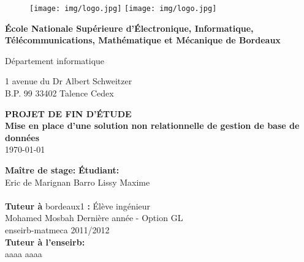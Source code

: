 \def\logo{
  \begin {figure}[H]
	\texttt{[image: img/logo.jpg]}
        \hspace{10,3cm}
	\texttt{[image: img/logo.jpg]}
	\label{logo}
  \end {figure}
}

\def\title{Mise en place d'une solution non relationnelle de gestion de base de données}

\def\intervenant{
        \begin{flushleft}
	  \begin{tabbing}
		\textbf{Maître de stage:}
                \hspace{7.2cm} \=\textbf{Étudiant:} \\
                \noindent Eric de {\sc Marignan}
                \> {\sc Barro} Lissy Maxime\\
                \> \\
                \noindent \textbf{Tuteur à} {\sc bordeaux}1 {\bf :}
                \> Élève ingénieur\\
                \noindent Mohamed {\sc Mosbah}
                \> Dernière année - Option GL \\ 
                \> {\sc enseirb-matmeca} 2011/2012 \\
                \noindent \textbf{Tuteur à l'{\sc enseirb}:}
                \> \\
                \noindent aaaa {\sc aaaa}
	  \end{tabbing}
        \end{flushleft}
}

\begin{titlepage}
  \logo
  \begin{flushleft}
    \textbf{École Nationale Supérieure d’Électronique, Informatique,
      Télécommunications, Mathématique et Mécanique de Bordeaux}

    \vspace{0.5cm}

    \textsf{Département informatique}

    \vspace{0.5cm}

   1 avenue du Dr Albert Schweitzer\\
   B.P. 99 33402 Talence Cedex

    
  \end{flushleft}
  
  \vspace{4cm}
	\begin{center}
	  {\bf PROJET DE FIN D'ÉTUDE}\\
	  \vspace{1cm}
		 {\LARGE\bf \title}\\
\vspace{1cm}
           \today

	\end{center}


        \vspace{4cm}
        \intervenant

\newpage


\end{titlepage}

